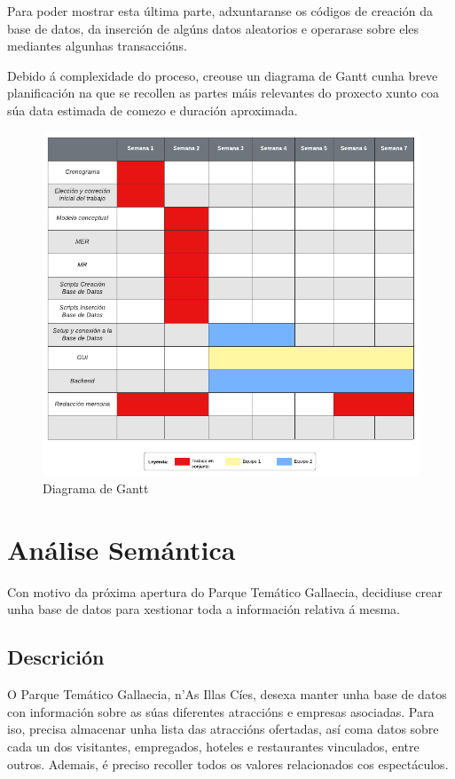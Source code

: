 \documentclass[12pt,a4paper]{book}
\theoremstyle{definition}
\theoremstyle{break}
\begin{document}
Para poder mostrar esta última parte, adxuntaranse os códigos de creación da base de datos, da inserción de algúns datos aleatorios e operarase sobre eles mediantes algunhas transaccións. 

Debido á complexidade do proceso, creouse un diagrama de Gantt cunha breve planificación na que se recollen as partes máis relevantes do proxecto xunto coa súa data estimada de comezo e duración aproximada. 

\begin{figure} [H] \centering
	\caption{Diagrama de Gantt}
	\includegraphics[width=\textwidth]{Diagrama de Gantt.pdf}
\end{figure}
 

\chapter{Análise Semántica}
Con motivo da próxima apertura do Parque Temático {\logo Gallaecia}, decidiuse crear unha base de datos para xestionar toda a información relativa á mesma.

\section{Descrición}
O Parque Temático {\logo Gallaecia}, n'As Illas Cíes, desexa manter unha base de datos con información sobre as súas diferentes atraccións e empresas asociadas. Para iso, precisa almacenar unha lista das atraccións ofertadas, así coma datos sobre cada un dos visitantes, empregados, hoteles e restaurantes vinculados, entre outros. Ademais, é preciso recoller todos os valores relacionados cos espectáculos.
\end{document}
